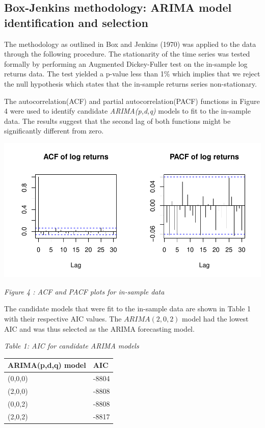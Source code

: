 \documentclass[12pt,a4paper]{article}
\numberwithin{equation}{section}
\numberwithin{figure}{section}
\numberwithin{table}{section}
\let\origtable\table
\let\endorigtable\endtable
\renewenvironment{table}[1][2] {
    \expandafter\origtable\expandafter[H]
} {
    \endorigtable
}
\begin{document}
\subsection{Box-Jenkins methodology: ARIMA model identification and
selection}\label{box-jenkins-methodology-arima-model-identification-and-selection}

The methodology as outlined in Box and Jenkins (1970) was applied to the
data through the following procedure. The stationarity of the time
series was tested formally by performing an Augmented Dickey-Fuller test
on the in-sample log returns data. The test yielded a p-value less than
1\% which implies that we reject the null hypothesis which states that
the in-sample returns series non-stationary.

The autocorrelation(ACF) and partial autocorrelation(PACF) functions in
Figure 4 were used to identify candidate \emph{ARIMA(p,d,q)} models to
fit to the in-sample data. The results suggest that the second lag of
both functions might be significantly different from zero.

\begin{center}\includegraphics{Draft_Paper_files/figure-latex/acf_and_pacf_plot-1} \end{center}

\emph{Figure 4 : ACF and PACF plots for in-sample data}

The candidate models that were fit to the in-sample data are shown in
Table 1 with their respective AIC values. The \(ARIMA(2,0,2)\) model had
the lowest AIC and was thus selected as the ARIMA forecasting model.

\emph{Table 1: AIC for candidate ARIMA models}

\begin{table}[H]
\centering
\begin{tabular}{ll}
  \hline
ARIMA(p,d,q) model & AIC \\ 
  \hline
(0,0,0) & -8804 \\ 
  (2,0,0) & -8808 \\ 
  (0,0,2) & -8808 \\ 
  (2,0,2) & -8817 \\ 
   \hline
\end{tabular}
\end{table}
\end{document}
